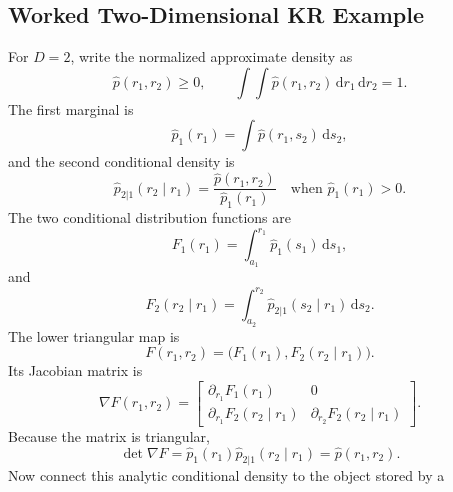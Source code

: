 \documentclass[11pt]{article}
\numberwithin{equation}{section}
\newcommand{\dd}{\,\mathrm d}
\begin{document}
\subsection*{Worked Two-Dimensional KR Example}

For \(D=2\), write the normalized approximate density as
\begin{equation}
    \widehat p(r_1,r_2)\ge0,
    \qquad
    \int\!\!\int \widehat p(r_1,r_2)\dd r_1\dd r_2=1.
    \label{eq:p24-p23-kr2-1}
\end{equation}
The first marginal is
\begin{equation}
    \widehat p_1(r_1)
    =
    \int \widehat p(r_1,s_2)\dd s_2,
    \label{eq:p24-p23-kr2-2}
\end{equation}
and the second conditional density is
\begin{equation}
    \widehat p_{2|1}(r_2\mid r_1)
    =
    \frac{\widehat p(r_1,r_2)}{\widehat p_1(r_1)}
    \quad\text{when }\widehat p_1(r_1)>0.
    \label{eq:p24-p23-kr2-3}
\end{equation}
The two conditional distribution functions are
\begin{equation}
    F_1(r_1)
    =
    \int_{a_1}^{r_1}\widehat p_1(s_1)\dd s_1,
    \label{eq:p24-p23-kr2-4}
\end{equation}
and
\begin{equation}
    F_2(r_2\mid r_1)
    =
    \int_{a_2}^{r_2}
    \widehat p_{2|1}(s_2\mid r_1)\dd s_2.
    \label{eq:p24-p23-kr2-5}
\end{equation}
The lower triangular map is
\begin{equation}
    F(r_1,r_2)=
    \bigl(F_1(r_1),F_2(r_2\mid r_1)\bigr).
    \label{eq:p24-p23-kr2-6}
\end{equation}
Its Jacobian matrix is
\begin{equation}
    \nabla F(r_1,r_2)
    =
    \begin{bmatrix}
    \partial_{r_1}F_1(r_1) & 0\\
    \partial_{r_1}F_2(r_2\mid r_1) &
    \partial_{r_2}F_2(r_2\mid r_1)
    \end{bmatrix}.
    \label{eq:p24-p23-kr2-7}
\end{equation}
Because the matrix is triangular,
\begin{equation}
    \det\nabla F
    =
    \widehat p_1(r_1)\widehat p_{2|1}(r_2\mid r_1)
    =
    \widehat p(r_1,r_2).
    \label{eq:p24-p23-kr2-8}
\end{equation}
Now connect this analytic conditional density to the object stored by a
\end{document}
